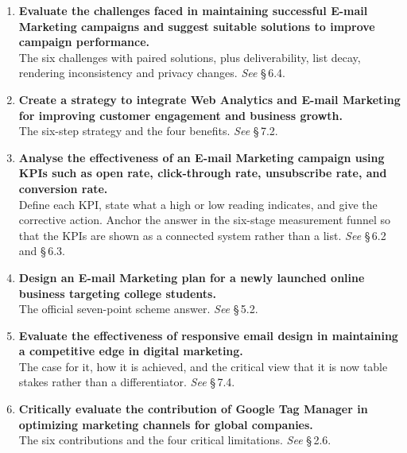 \begin{enumerate}[leftmargin=2.2em,itemsep=1.4ex]
\item \textbf{Evaluate the challenges faced in maintaining successful E-mail
      Marketing campaigns and suggest suitable solutions to improve campaign
      performance.} \\
      The six challenges with paired solutions, plus deliverability, list decay,
      rendering inconsistency and privacy changes. \hfill\emph{See} \S\,6.4.

\item \textbf{Create a strategy to integrate Web Analytics and E-mail Marketing
      for improving customer engagement and business growth.}
      \\
      The six-step strategy and the four benefits. \hfill\emph{See} \S\,7.2.

\item \textbf{Analyse the effectiveness of an E-mail Marketing campaign using
      KPIs such as open rate, click-through rate, unsubscribe rate, and
      conversion rate.} \\
      Define each KPI, state what a high or low reading indicates, and give the
      corrective action. Anchor the answer in the six-stage measurement funnel so
      that the KPIs are shown as a connected system rather than a list.
      \hfill\emph{See} \S\,6.2 and \S\,6.3.

\item \textbf{Design an E-mail Marketing plan for a newly launched online business
      targeting college students.} \\
      The official seven-point scheme answer. \hfill\emph{See} \S\,5.2.

\item \textbf{Evaluate the effectiveness of responsive email design in
      maintaining a competitive edge in digital marketing.}
      \\
      The case for it, how it is achieved, and the critical view that it is now
      table stakes rather than a differentiator. \hfill\emph{See} \S\,7.4.

\item \textbf{Critically evaluate the contribution of Google Tag Manager in
      optimizing marketing channels for global companies.}
      \\
      The six contributions and the four critical limitations.
      \hfill\emph{See} \S\,2.6.


\end{enumerate}
